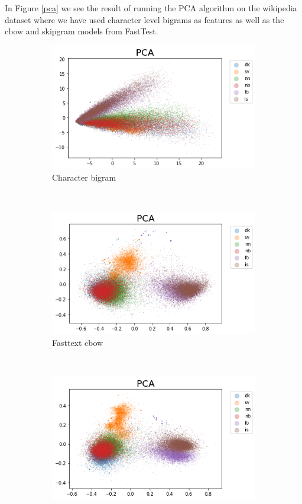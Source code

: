 In Figure \ref{pca} we see the result of running the PCA algorithm on the wikipedia dataset where we have used character level bigrams as features as well as the cbow and skipgram models from FastTest.\\


\begin{figure}[h!]
    \centering
    \begin{subfigure}[b]{0.47\textwidth}
        \includegraphics[width=\textwidth]{figs/pcachar2}
        \caption{Character bigram}
    \end{subfigure}
    ~
    \begin{subfigure}[b]{0.47\textwidth}
        \includegraphics[width=\textwidth]{figs/pcacbow1}
        \caption{Fasttext cbow}
    \end{subfigure}
    ~
    \begin{subfigure}[b]{0.47\textwidth}
        \includegraphics[width=\textwidth]{figs/pcaskipgram1}

\end{subfigure}
\end{figure}
